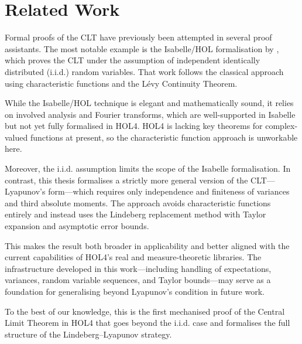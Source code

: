 \section{Related Work}

Formal proofs of the CLT have previously been attempted in several proof assistants. The most notable example is the Isabelle/HOL formalisation by \cite{serafin2015formally}, which proves the CLT under the assumption of independent identically distributed (i.i.d.) random variables. That work follows the classical approach using characteristic functions and the Lévy Continuity Theorem.

While the Isabelle/HOL technique is elegant and mathematically sound, it relies on involved analysis and Fourier transforms, which are well-supported in Isabelle but not yet fully formalised in HOL4. HOL4 is lacking key theorems for complex-valued functions at present, so the characteristic function approach is unworkable here.

Moreover, the i.i.d. assumption limits the scope of the Isabelle formalisation. In contrast, this thesis formalises a strictly more general version of the CLT—Lyapunov’s form—which requires only independence and finiteness of variances and third absolute moments. The approach avoids characteristic functions entirely and instead uses the Lindeberg replacement method with Taylor expansion and asymptotic error bounds.

This makes the result both broader in applicability and better aligned with the current capabilities of HOL4’s real and measure-theoretic libraries. The infrastructure developed in this work—including handling of expectations, variances, random variable sequences, and Taylor bounds—may serve as a foundation for generalising beyond Lyapunov’s condition in future work.

To the best of our knowledge, this is the first mechanised proof of the Central Limit Theorem in HOL4 that goes beyond the i.i.d. case and formalises the full structure of the Lindeberg–Lyapunov strategy.
